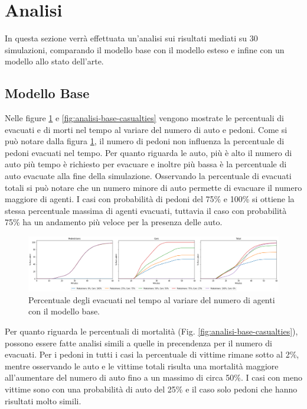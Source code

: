 \section{Analisi}
\label{sec:analisi}
In questa sezione verrà effettuata un'analisi sui risultati mediati su 30 simulazioni,
comparando il modello base con il modello esteso e infine con un modello allo stato dell'arte.

\subsection{Modello Base}
Nelle figure \ref{fig:analisi-base-evacuated} e \ref{fig:analisi-base-casualties} vengono mostrate le percentuali di evacuati
e di morti nel tempo al variare del numero di auto e pedoni.
%
Come si può notare dalla figura \ref{fig:analisi-base-evacuated}, il numero di pedoni non influenza la percentuale di pedoni evacuati nel tempo.
%
Per quanto riguarda le auto, più è alto il numero di auto più tempo è richiesto per evacuare e inoltre più bassa è la percentuale di auto evacuate alla fine della simulazione.
%
Osservando la percentuale di evacuati totali si può notare che un numero minore di auto permette di evacuare il numero maggiore di agenti.
I casi con probabilità di pedoni del 75\% e 100\% si ottiene la stessa percentuale massima di agenti evacuati,
tuttavia il caso con probabilità 75\% ha un andamento più veloce per la presenza delle auto.

\begin{figure}[ht]
    \centering
    \includegraphics[width=\textwidth]{images/analisi/base-evacuated.png}
    \caption{Percentuale degli evacuati nel tempo al variare del numero di agenti con il modello base.}
    \label{fig:analisi-base-evacuated}
\end{figure}

Per quanto riguarda le percentuali di mortalità (Fig. \ref{fig:analisi-base-casualties}), possono essere fatte analisi simili a quelle in precendenza
per il numero di evacuati.
Per i pedoni in tutti i casi la percentuale di vittime rimane sotto al 2\%, mentre osservando le auto e le vittime totali
risulta una mortalità maggiore all'aumentare del numero di auto fino a un massimo di circa 50\%.
I casi con meno vittime sono con una probabilità di auto del 25\% e il caso solo pedoni che hanno risultati molto simili.


